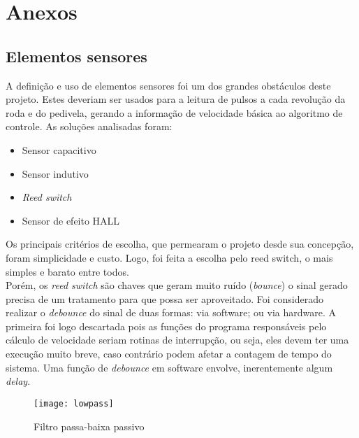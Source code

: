 \documentclass[a4paper,11pt]{article}
\begin{document}
\pagebreak
%
\section{Anexos}
\label{sec:anexos}

%
\subsection{Elementos sensores}
\label{sensores}
A definição e uso de elementos sensores foi um dos grandes obstáculos deste
projeto. Estes deveriam ser usados para a leitura de pulsos a cada revolução da
roda e do pedivela, gerando a informação de velocidade básica ao algoritmo de
controle. As soluções analisadas foram:
\begin{itemize}
 \item Sensor capacitivo
 \item Sensor indutivo
 \item \textit{Reed switch}
 \item Sensor de efeito HALL
\end{itemize}
Os principais critérios de escolha, que permearam o projeto desde sua concepção,
foram simplicidade e custo. Logo, foi feita a escolha pelo reed switch, o
mais simples e barato entre todos. \\
Porém, os \textit{reed switch} são chaves que geram muito ruído
(\textit{bounce}) o sinal gerado precisa de um tratamento para que possa ser
aproveitado. Foi considerado realizar o \textit{debounce} do sinal de duas
formas: via software; ou via hardware. A primeira foi logo descartada pois as
funções do programa responsáveis pelo cálculo de velocidade seriam rotinas de
interrupção, ou seja, eles devem ter uma execução muito breve, caso contrário
podem afetar a contagem de tempo do sistema. Uma função de \textit{debounce} em
software envolve, inerentemente algum \textit{delay}.\\

\begin{figure}[ht]
 \begin{center}
  \texttt{[image: lowpass]}
 \end{center}
 \caption{Filtro passa-baixa passivo}
 \label{fig:lowpass}
\end{figure}
\end{document}

